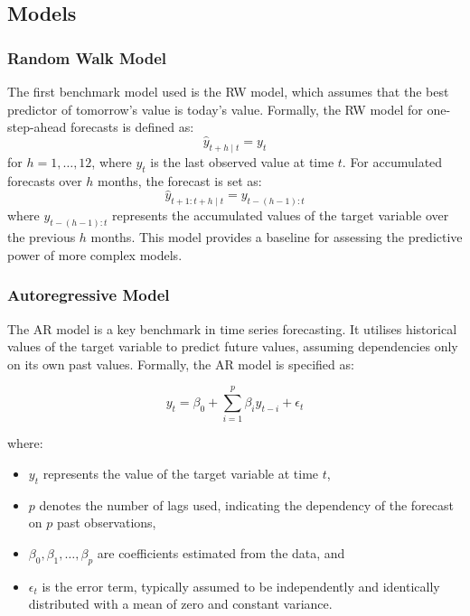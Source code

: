 \subsection{Models} \label{sec:methods_models}

\subsubsection{Random Walk Model}

The first benchmark model used is the RW model, which assumes that the best predictor of tomorrow's value is today's value. Formally, the RW model for one-step-ahead forecasts is defined as:
\begin{equation}
    \widehat{y}_{t+h \mid t} = y_t
\end{equation}
for $h=1, \ldots, 12$, where $y_t$ is the last observed value at time $t$. For accumulated forecasts over $h$ months, the forecast is set as:
\begin{equation}
    \widehat{y}_{t+1:t+h \mid t} = y_{t-(h-1):t}
\end{equation}
where $y_{t-(h-1):t}$ represents the accumulated values of the target variable over the previous $h$ months. This model provides a baseline for assessing the predictive power of more complex models.

\subsubsection{Autoregressive Model}

The AR model is a key benchmark in time series forecasting. It utilises historical values of the target variable to predict future values, assuming dependencies only on its own past values. Formally, the AR model is specified as:

\begin{equation}
    y_t = \beta_0 + \sum_{i=1}^{p} \beta_i y_{t-i} + \epsilon_t
\end{equation}

where:
\begin{itemize}[itemsep=0pt,parsep=0pt,topsep=0pt,partopsep=0pt]
    \item $y_t$ represents the value of the target variable at time $t$,
    \item $p$ denotes the number of lags used, indicating the dependency of the forecast on $p$ past observations,
    \item $\beta_0, \beta_1, \ldots, \beta_p$ are coefficients estimated from the data, and
    \item $\epsilon_t$ is the error term, typically assumed to be independently and identically distributed with a mean of zero and constant variance.
\end{itemize}

